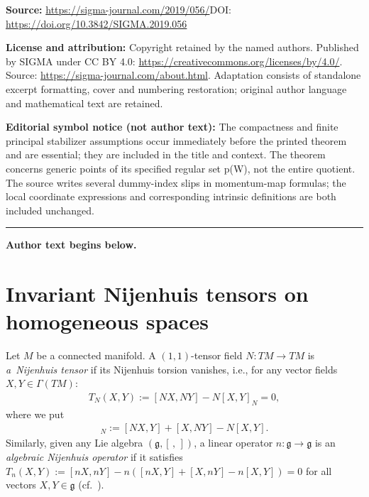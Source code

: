\documentclass[11pt]{article}
\numberwithin{equation}{section}
\begin{document}
\noindent\textbf{Source:} \url{https://sigma-journal.com/2019/056/}\quad DOI: \url{https://doi.org/10.3842/SIGMA.2019.056}\par
\noindent\textbf{License and attribution:} Copyright retained by the named authors. Published by SIGMA under CC BY 4.0: \url{https://creativecommons.org/licenses/by/4.0/}. Source: \url{https://sigma-journal.com/about.html}. Adaptation consists of standalone excerpt formatting, cover and numbering restoration; original author language and mathematical text are retained.\par
\noindent\textbf{Editorial symbol notice (not author text):} The compactness and finite principal stabilizer assumptions occur immediately before the printed theorem and are essential; they are included in the title and context. The theorem concerns generic points of its specified regular set p(W), not the entire quotient. The source writes several dummy-index slips in momentum-map formulas; the local coordinate expressions and corresponding intrinsic definitions are both included unchanged.\par
\medskip\hrule\medskip\noindent\textbf{Author text begins below.}\par
\setcounter{section}{1}
\setcounter{subsection}{0}
\setcounter{subsubsection}{0}
\setcounter{Theorem}{0}
\setcounter{equation}{0}
\section{Invariant Nijenhuis tensors on homogeneous spaces}\label{s.1}

\begin{Definition}\label{nijdef}Let $M$ be a connected manifold. A $(1,1)$-tensor field $N\colon TM\to TM$ is \emph{a~Nijenhuis tensor} if its Nijenhuis torsion vanishes,
i.e., for any vector fields $X,Y\in \Gamma(TM)$:
\begin{gather*}
 T_N(X,Y):=[NX,NY]-N [X,Y]_N=0,
\end{gather*}
where we put
\begin{gather*}
[X,Y]_N:=[NX,Y]+[X,NY]-N[X,Y].
\end{gather*}
Similarly, given any Lie algebra $(\mathfrak{g}, [\,,\,])$, a linear operator $n\colon \mathfrak{g}\to\mathfrak{g}$ is an \emph{algebraic Nijenhuis operator} if it satisfies
$T_n(X,Y):=[nX,nY]-n ( [nX,Y] + [X,nY] - n[X,Y] )=0$ for all vectors $X,Y\in \mathfrak{g}$ (cf.~\cite{golsok2000,mks}).
\end{Definition}
\end{document}
